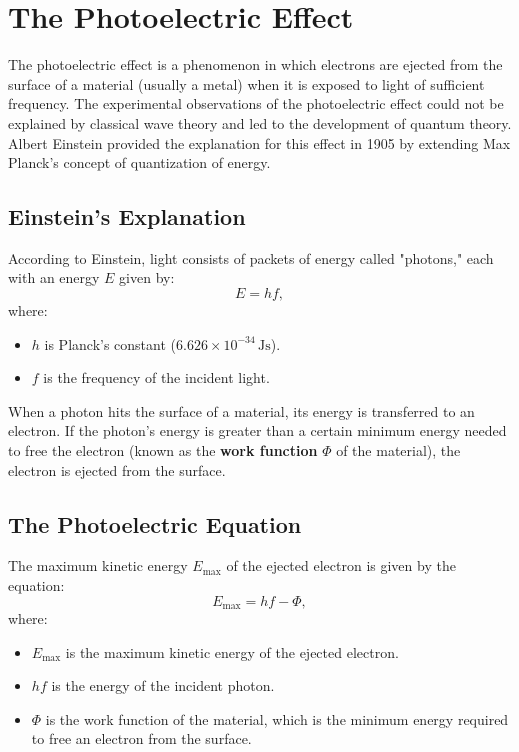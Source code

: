 \documentclass{report}
\begin{document}
\section{The Photoelectric Effect}

The photoelectric effect is a phenomenon in which electrons are ejected from the surface of a material (usually a metal) when it is exposed to light of sufficient frequency. The experimental observations of the photoelectric effect could not be explained by classical wave theory and led to the development of quantum theory. Albert Einstein provided the explanation for this effect in 1905 by extending Max Planck's concept of quantization of energy.

\subsection{Einstein’s Explanation}

According to Einstein, light consists of packets of energy called "photons," each with an energy $E$ given by:
\[
	E = h f,
\]
where:
\begin{itemize}
	\item $h$ is Planck’s constant ($6.626 \times 10^{-34} \, \text{Js}$).
	\item $f$ is the frequency of the incident light.
\end{itemize}

When a photon hits the surface of a material, its energy is transferred to an electron. If the photon's energy is greater than a certain minimum energy needed to free the electron (known as the \textbf{work function} $\Phi$ of the material), the electron is ejected from the surface.

\subsection{The Photoelectric Equation}

The maximum kinetic energy $E_{\text{max}}$ of the ejected electron is given by the equation:
\[
	E_{\text{max}} = h f - \Phi,
\]
where:
\begin{itemize}
	\item $E_{\text{max}}$ is the maximum kinetic energy of the ejected electron.
	\item $h f$ is the energy of the incident photon.
	\item $\Phi$ is the work function of the material, which is the minimum energy required to free an electron from the surface.
\end{itemize}
\end{document}
